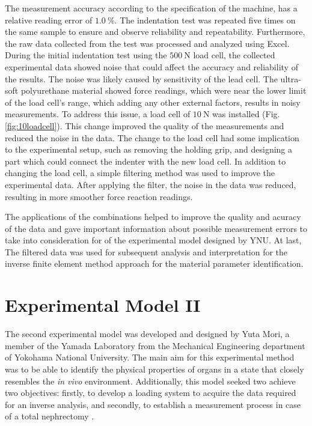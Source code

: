 The measurement accuracy according to the specification of the machine, has 
a relative reading error of $\SI{1.0}{\percent}$. The indentation test 
was repeated five times on the same sample to ensure and observe 
reliability and repeatability. Furthermore, the raw data collected from the test 
was processed and analyzed using Excel.\\

During the initial indentation test using the $\SI{500}{\newton}$ load cell, 
the collected experimental data showed noise that could affect the accuracy 
and reliability of the results. The noise was likely caused by sensitivity 
of the lead cell. The ultra-soft polyurethane material showed force readings, which 
were near the lower limit of the load cell's range, which adding any other external factors, 
results in noisy measurements. To address this issue, a load cell of $\SI{10}{\newton}$
was installed (Fig. \ref{fig:10loadcell}). This change improved the quality of 
the measurements and reduced the noise in the data. The change to the load cell had some 
implication to the experimental setup, such as removing the holding grip, and designing 
a part which could connect the indenter with the new load cell. In addition to changing 
the load cell, a simple filtering method was used to improve the experimental data. After 
applying the filter, the noise in the data was reduced, resulting in more smoother 
force reaction readings. 

The applications of the combinations helped to improve the quality and acuracy 
of the data and gave important information about possible measurement errors to 
take into consideration for of the experimental model 
designed by YNU. At last, The filtered data was used for subsequent analysis and 
interpretation for the inverse finite element method approach for the material parameter 
identification.


\section{Experimental Model II}
\label{section:expmod2}

The second experimental model was developed and designed by Yuta Mori, a 
member of the Yamada Laboratory from the Mechanical Engineering department of 
 Yokohama National University. 
The main aim for this experimental method was to be able to identify the physical 
properties of organs in a state that closely resembles the \textit{in vivo} environment.
Additionally, this model seeked two achieve two objectives: firstly, to develop a 
loading system to acquire the data required for an inverse analysis, and secondly, 
to establish a measurement process in case of a total nephrectomy \cite{Mori2022}. 

